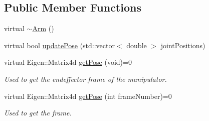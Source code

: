 \subsection*{Public Member Functions}
\begin{DoxyCompactItemize}
\item 
virtual \hyperlink{class_arm_ae1bcf12831b42e93d431efe3b7910b5e}{$\sim$\+Arm} ()
\item 
virtual bool \hyperlink{class_arm_a9bfe3a3f230c8fa8a39f88cce2d6b597}{update\+Pose} (std\+::vector$<$ double $>$ joint\+Positions)
\item 
virtual Eigen\+::\+Matrix4d \hyperlink{class_arm_af89cd963a4321584dfb8f9715c02f5be}{get\+Pose} (void)=0
\begin{DoxyCompactList}\small\item\em Used to get the endeffector frame of the manipulator. \end{DoxyCompactList}\item 
virtual Eigen\+::\+Matrix4d \hyperlink{class_arm_a994d35ca0dae04725fe0921c4f7d7e38}{get\+Pose} (int frame\+Number)=0
\begin{DoxyCompactList}\small\item\em Used to get the frame. \end{DoxyCompactList}\end{DoxyCompactItemize}
